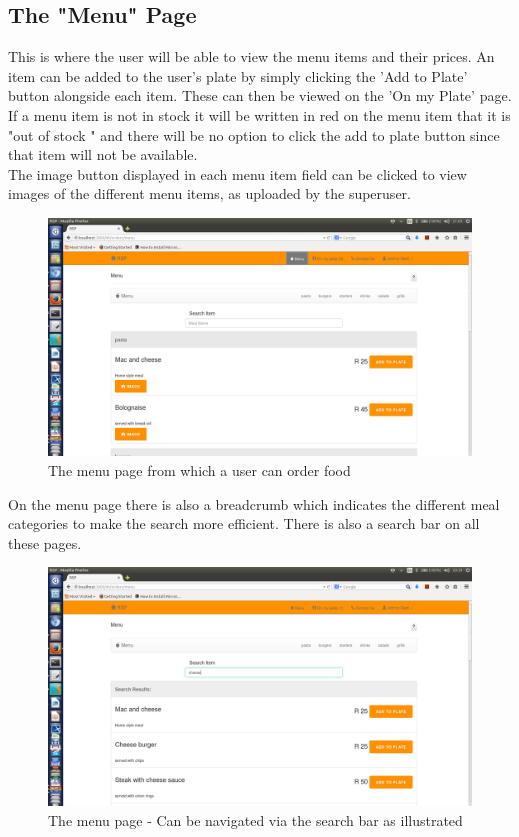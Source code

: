 \documentclass[a4paper,12pt]{report}
\begin{document}
\subsection{The "Menu" Page} 
This is where the user will be able to view the menu items and their prices. An item can be added to the user's plate by simply clicking the 'Add to Plate' button alongside each item. These can then be viewed on the 'On my Plate' page.
If a menu item is not in stock it will be written in red on the menu item that it is "out of stock " and there will be no  option to click the add to plate button since that item will not be available. 
\\
The image button displayed in each menu item field can be clicked to view images of the different menu items, as uploaded by the superuser.
\begin{figure}[H]
  \centering
    \includegraphics[width=1.0\textwidth]{screenshots/beforePasta.png}
    \caption{The menu page from which a user can order food} 
\end{figure}
On the menu page there is also a breadcrumb which indicates the different meal categories to make the search more efficient. There is also a search bar on all these pages. 

\begin{figure}[H]
  \centering
    \includegraphics[width=1.0\textwidth]{screenshots/searchCheese.png}
    \caption{The menu page - Can be navigated via the search bar as illustrated} 
\end{figure}
\end{document}
